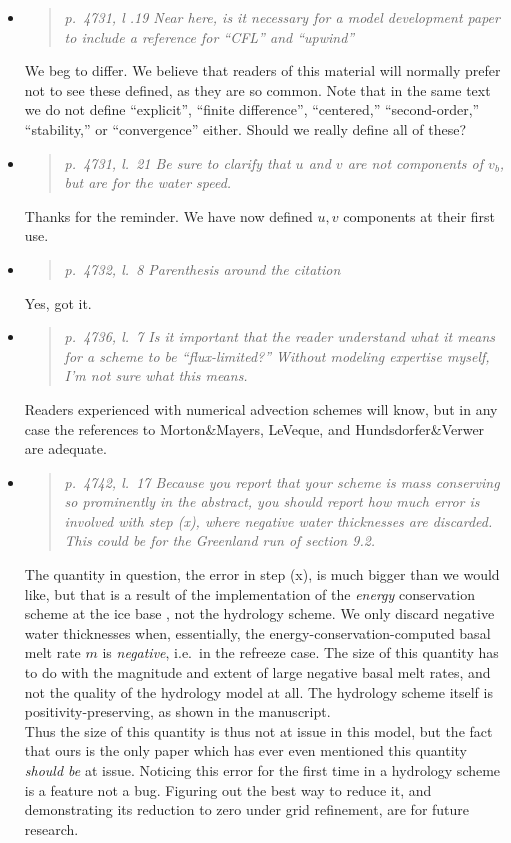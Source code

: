 \documentclass[11pt,reqno]{amsart}
\newcommand{\reply}[2]{
\medskip\medskip
\item  \begin{quote}
\emph{#1}
\end{quote}

\medskip
\noindent #2}
\begin{document}
\begin{itemize}
\reply{p.~4731, l .19 Near here, is it necessary for a model development paper to include a
reference for ``CFL'' and ``upwind''}
{We beg to differ.  We believe that readers of this material will normally prefer not to see these defined, as they are so common.  Note that in the same text we do not define ``explicit'', ``finite difference'', ``centered,'' ``second-order,'' ``stability,'' or ``convergence'' either.  Should we really define all of these?}

\reply{p.~4731, l.~21 Be sure to clarify that $u$ and $v$ are not components of $v_b$, but are for the water speed.}
{Thanks for the reminder.  We have now defined $u,v$ components at their first use.}

\reply{p.~4732, l.~8 Parenthesis around the citation}
{Yes, got it.}

\reply{p.~4736, l.~7 Is it important that the reader understand what it means for a scheme to be ``flux-limited?''  Without modeling expertise myself, I’m not sure what this means.}
{Readers experienced with numerical advection schemes will know, but in any case the references to Morton\&Mayers, LeVeque, and Hundsdorfer\&Verwer are adequate.}

\reply{p.~4742, l.~17 Because you report that your scheme is mass conserving so prominently
in the abstract, you should report how much error is involved with step (x), where
negative water thicknesses are discarded. This could be for the Greenland run of
section 9.2.}
{The quantity in question, the error in step (x), is much bigger than we would like, but that is a result of the implementation of the \emph{energy} conservation scheme at the ice base \cite{AschwandenBuelerKhroulevBlatter}, not the hydrology scheme.  We only discard negative water thicknesses when, essentially, the energy-conservation-computed basal melt rate $m$ is \emph{negative}, i.e.~in the refreeze case.  The size of this quantity has to do with the magnitude and extent of large negative basal melt rates, and not the quality of the hydrology model at all.  The hydrology scheme itself is positivity-preserving, as shown in the manuscript. \\
\indent Thus the size of this quantity is thus not at issue in this model, but the fact that ours is the only paper which has ever even mentioned this quantity \emph{should be} at issue.  Noticing this error for the first time in a hydrology scheme is a feature not a bug.  Figuring out the best way to reduce it, and demonstrating its reduction to zero under grid refinement, are for future research.}


\end{itemize}
\end{document}
